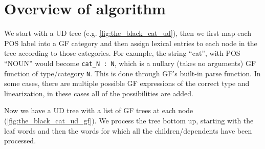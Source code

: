 % 
% 
% 
% 

\section{Overview of algorithm}\label{sec:overview-of-algorithm}

We start with a \ac{UD} tree (e.g. \autoref{fig:the_black_cat_ud}), then we first map each \ac{POS} label into a \ac{GF} category and then assign lexical entries to each node in the tree according to those categories. For example, the string ``cat'', with \ac{POS} ``NOUN'' would become \lstinline|cat_N : N|, which is a nullary (takes no arguments) \ac{GF} function of type/category \lstinline|N|. This is done through \ac{GF}'s built-in parse function. In some cases, there are multiple possible \ac{GF} expressions of the correct type and linearization, in these cases all of the possibilities are added.

Now we have a \ac{UD} tree with a list of \ac{GF} trees at each node (\autoref{fig:the_black_cat_ud_gf}). We process the tree bottom up, starting with the leaf words and then the words for which all the children/dependents have been processed.

